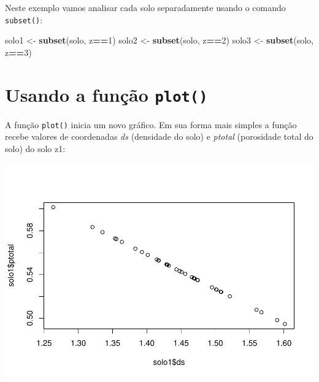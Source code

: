 \documentclass[
]{book}
\newenvironment{Shaded}{\begin{snugshade}}{\end{snugshade}}
\newcommand{\DecValTok}[1]{\textcolor[rgb]{0.00,0.00,0.81}{#1}}
\newcommand{\KeywordTok}[1]{\textcolor[rgb]{0.13,0.29,0.53}{\textbf{#1}}}
\newcommand{\NormalTok}[1]{#1}
\newcommand{\OperatorTok}[1]{\textcolor[rgb]{0.81,0.36,0.00}{\textbf{#1}}}
\newcommand{\StringTok}[1]{\textcolor[rgb]{0.31,0.60,0.02}{#1}}
\begin{document}
Neste exemplo vamos analisar cada solo separadamente usando o comando \texttt{subset()}:

\begin{Shaded}
\begin{Highlighting}[]
\NormalTok{solo1 <-}\StringTok{ }\KeywordTok{subset}\NormalTok{(solo, z}\OperatorTok{==}\DecValTok{1}\NormalTok{)}
\NormalTok{solo2 <-}\StringTok{ }\KeywordTok{subset}\NormalTok{(solo, z}\OperatorTok{==}\DecValTok{2}\NormalTok{)}
\NormalTok{solo3 <-}\StringTok{ }\KeywordTok{subset}\NormalTok{(solo, z}\OperatorTok{==}\DecValTok{3}\NormalTok{)}
\end{Highlighting}
\end{Shaded}

\hypertarget{usando-a-funuxe7uxe3o-plot}{%
\section{\texorpdfstring{Usando a função \texttt{plot()}}{Usando a função plot()}}\label{usando-a-funuxe7uxe3o-plot}}

A função \texttt{plot()} inicia um novo gráfico. Em sua forma mais simples a função
recebe valores de coordenadas \emph{ds} (densidade do solo) e \emph{ptotal} (porosidade total do solo) do solo z1:

\begin{Shaded}
\end{Shaded}

\includegraphics{TudodoR_files/figure-latex/unnamed-chunk-152-1.pdf}
\end{document}
